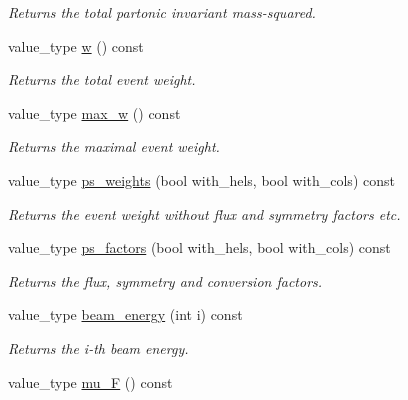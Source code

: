 \begin{DoxyCompactItemize}
\begin{DoxyCompactList}\small\item\em Returns the total partonic invariant mass-\/squared. \end{DoxyCompactList}\item 
\hypertarget{a00210_a639c007c5544b462c28c46c0fc5e0694}{value\-\_\-type \hyperlink{a00210_a639c007c5544b462c28c46c0fc5e0694}{w} () const }\label{a00210_a639c007c5544b462c28c46c0fc5e0694}

\begin{DoxyCompactList}\small\item\em Returns the total event weight. \end{DoxyCompactList}\item 
\hypertarget{a00210_a95492c5d162bfda7859f161110692d08}{value\-\_\-type \hyperlink{a00210_a95492c5d162bfda7859f161110692d08}{max\-\_\-w} () const }\label{a00210_a95492c5d162bfda7859f161110692d08}

\begin{DoxyCompactList}\small\item\em Returns the maximal event weight. \end{DoxyCompactList}\item 
value\-\_\-type \hyperlink{a00210_abf627ab0d6ee6b3124049fd60096be54}{ps\-\_\-weights} (bool with\-\_\-hels, bool with\-\_\-cols) const 
\begin{DoxyCompactList}\small\item\em Returns the event weight without flux and symmetry factors etc. \end{DoxyCompactList}\item 
value\-\_\-type \hyperlink{a00210_a7dcc2b237825ce0f930c02513a31a24c}{ps\-\_\-factors} (bool with\-\_\-hels, bool with\-\_\-cols) const 
\begin{DoxyCompactList}\small\item\em Returns the flux, symmetry and conversion factors. \end{DoxyCompactList}\item 
\hypertarget{a00210_a8387e14e09be662bc515d9429ef941a1}{value\-\_\-type \hyperlink{a00210_a8387e14e09be662bc515d9429ef941a1}{beam\-\_\-energy} (int i) const }\label{a00210_a8387e14e09be662bc515d9429ef941a1}

\begin{DoxyCompactList}\small\item\em Returns the i-\/th beam energy. \end{DoxyCompactList}\item 
\hypertarget{a00210_a5f54990b04f9222933b32b8cd13ac4d8}{value\-\_\-type \hyperlink{a00210_a5f54990b04f9222933b32b8cd13ac4d8}{mu\-\_\-\-F} () const }\label{a00210_a5f54990b04f9222933b32b8cd13ac4d8}


\end{DoxyCompactItemize}
